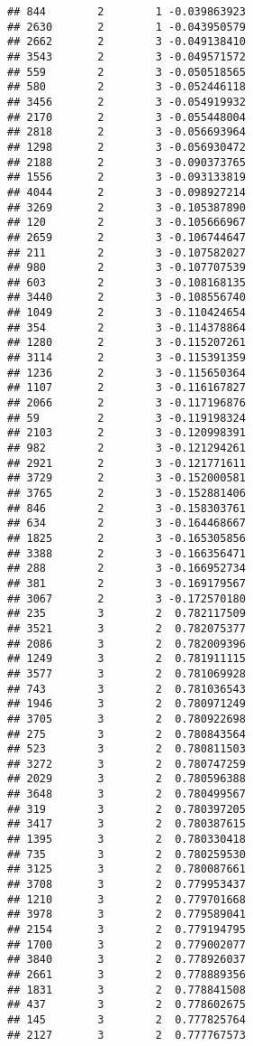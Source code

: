 \documentclass[
]{article}
\begin{document}
\begin{verbatim}
## 844        2        1 -0.039863923
## 2630       2        1 -0.043950579
## 2662       2        3 -0.049138410
## 3543       2        3 -0.049571572
## 559        2        3 -0.050518565
## 580        2        3 -0.052446118
## 3456       2        3 -0.054919932
## 2170       2        3 -0.055448004
## 2818       2        3 -0.056693964
## 1298       2        3 -0.056930472
## 2188       2        3 -0.090373765
## 1556       2        3 -0.093133819
## 4044       2        3 -0.098927214
## 3269       2        3 -0.105387890
## 120        2        3 -0.105666967
## 2659       2        3 -0.106744647
## 211        2        3 -0.107582027
## 980        2        3 -0.107707539
## 603        2        3 -0.108168135
## 3440       2        3 -0.108556740
## 1049       2        3 -0.110424654
## 354        2        3 -0.114378864
## 1280       2        3 -0.115207261
## 3114       2        3 -0.115391359
## 1236       2        3 -0.115650364
## 1107       2        3 -0.116167827
## 2066       2        3 -0.117196876
## 59         2        3 -0.119198324
## 2103       2        3 -0.120998391
## 982        2        3 -0.121294261
## 2921       2        3 -0.121771611
## 3729       2        3 -0.152000581
## 3765       2        3 -0.152881406
## 846        2        3 -0.158303761
## 634        2        3 -0.164468667
## 1825       2        3 -0.165305856
## 3388       2        3 -0.166356471
## 288        2        3 -0.166952734
## 381        2        3 -0.169179567
## 3067       2        3 -0.172570180
## 235        3        2  0.782117509
## 3521       3        2  0.782075377
## 2086       3        2  0.782009396
## 1249       3        2  0.781911115
## 3577       3        2  0.781069928
## 743        3        2  0.781036543
## 1946       3        2  0.780971249
## 3705       3        2  0.780922698
## 275        3        2  0.780843564
## 523        3        2  0.780811503
## 3272       3        2  0.780747259
## 2029       3        2  0.780596388
## 3648       3        2  0.780499567
## 319        3        2  0.780397205
## 3417       3        2  0.780387615
## 1395       3        2  0.780330418
## 735        3        2  0.780259530
## 3125       3        2  0.780087661
## 3708       3        2  0.779953437
## 1210       3        2  0.779701668
## 3978       3        2  0.779589041
## 2154       3        2  0.779194795
## 1700       3        2  0.779002077
## 3840       3        2  0.778926037
## 2661       3        2  0.778889356
## 1831       3        2  0.778841508
## 437        3        2  0.778602675
## 145        3        2  0.777825764
## 2127       3        2  0.777767573

\end{verbatim}
\end{document}
